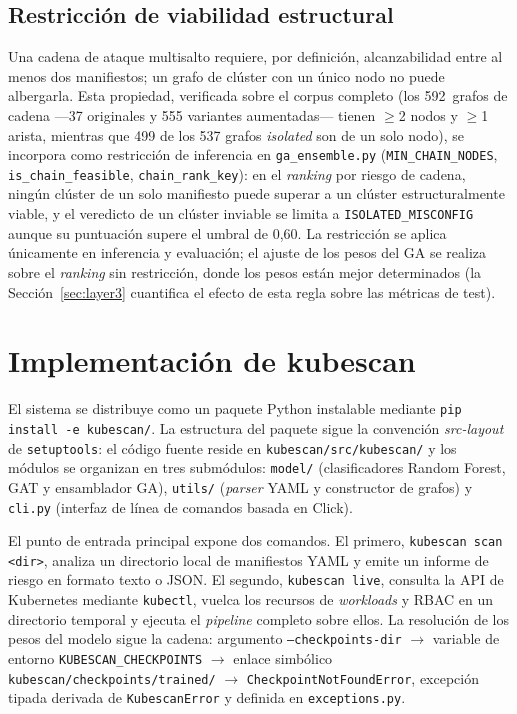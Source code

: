 \subsection{Restricción de viabilidad estructural}
\label{sec:gate_estructural}

Una cadena de ataque multisalto requiere, por definición, alcanzabilidad entre al
menos dos manifiestos; un grafo de clúster con un único nodo no puede albergarla.
Esta propiedad, verificada sobre el corpus completo (los 592~grafos de cadena
—37 originales y 555 variantes aumentadas— tienen \(\geq\)2 nodos y \(\geq\)1 arista,
mientras que 499 de los 537 grafos
\textit{isolated} son de un solo nodo), se incorpora como restricción de
inferencia en \texttt{ga\_ensemble.py} (\texttt{MIN\_CHAIN\_NODES},
\texttt{is\_chain\_feasible}, \texttt{chain\_rank\_key}): en el
\textit{ranking} por riesgo de cadena, ningún clúster de un solo manifiesto puede
superar a un clúster estructuralmente viable, y el veredicto de un clúster
inviable se limita a \texttt{ISOLATED\_MISCONFIG} aunque su puntuación supere el
umbral de 0,60. La restricción se aplica únicamente en inferencia y evaluación;
el ajuste de los pesos del \ac{GA} se realiza sobre el \textit{ranking} sin
restricción, donde los pesos están mejor determinados (la Sección~\ref{sec:layer3}
cuantifica el efecto de esta regla sobre las métricas de test).

\section{Implementación de kubescan}
\label{sec:implementacion}

El sistema se distribuye como un paquete Python instalable mediante
\texttt{pip install -e kubescan/}. La estructura del paquete sigue la convención
\textit{src-layout} de \texttt{setuptools}: el código fuente reside en
\texttt{kubescan/src/kubescan/} y los módulos se organizan en tres submódulos:
\texttt{model/} (clasificadores Random Forest, \ac{GAT} y ensamblador \ac{GA}), \texttt{utils/}
(\textit{parser} \acs{YAML} y constructor de grafos) y \texttt{cli.py} (interfaz de
línea de comandos basada en Click).

El punto de entrada principal expone dos comandos. El primero,
\texttt{kubescan scan <dir>}, analiza un directorio local de manifiestos \acs{YAML} y
emite un informe de riesgo en formato texto o \ac{JSON}. El segundo,
\texttt{kubescan live}, consulta la \ac{API} de Kubernetes mediante
\texttt{kubectl}, vuelca los recursos de \textit{workloads} y \ac{RBAC} en un directorio
temporal y ejecuta el \textit{pipeline} completo sobre ellos. La resolución de los
pesos del modelo sigue la cadena: argumento \texttt{--checkpoints-dir}
\(\to\) variable de entorno \texttt{KUBESCAN\_CHECKPOINTS} \(\to\) enlace simbólico
\texttt{kubescan/checkpoints/trained/} \(\to\) \texttt{CheckpointNotFoundError},
excepción tipada derivada de \texttt{KubescanError} y definida en
\texttt{exceptions.py}.

